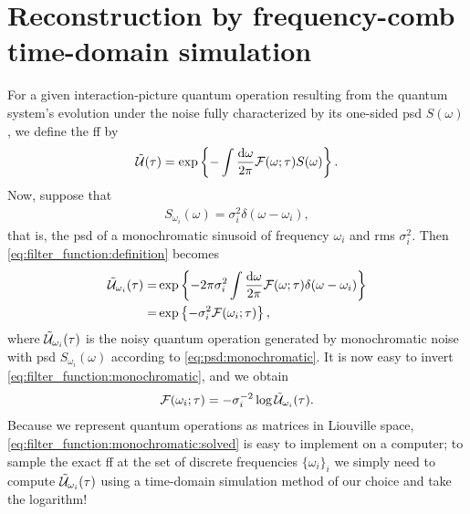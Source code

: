 \chapter{Reconstruction by frequency-comb time-domain simulation}\label{ch:filter_functions:validation}
For a {\color{RWTHmagenta75} given} interaction-picture quantum operation \liouvUe resulting from the quantum system's evolution under the noise fully characterized by its one-sided \gls{psd} $S(\omega)$, we define the \gls{ff} \FF by
\begin{align}
    \label{eq:filter_function:definition}
    \mathcal{\tilde{U}}(\tau) = \exp\left\{-\int\frac{\dd{\omega}}{2\pi}\mathcal{F}(\omega;\tau) S(\omega)\right\}.
\end{align}
Now, suppose that
\begin{align}
    \label{eq:psd:monochromatic}
    S_{\omega_i}(\omega) = \sigma_i^2 \delta(\omega - \omega_i), %
\end{align}
that is, the \gls{psd} of a monochromatic sinusoid of frequency $\omega_i$ and \gls{rms} $\sigma_i^2$.
Then \cref{eq:filter_function:definition} becomes
\begin{equation}
    \label{eq:filter_function:monochromatic}
    \begin{split}
        \mathcal{\tilde{U}}_{\omega_i}(\tau) =& \exp\left\lbrace -2\pi\sigma_i^2\int\frac{\dd{\omega}}{2\pi}\mathcal{F}(\omega;\tau)\delta(\omega - \omega_i)\right\rbrace \\
                                  =& \exp\left\lbrace -\sigma_i^2\mathcal{F}(\omega_i;\tau)\right\rbrace,
    \end{split}
\end{equation}
where $\mathcal{\tilde{U}}_{\omega_i}(\tau)$ is the noisy quantum operation generated by monochromatic noise with \gls{psd} $S_{\omega_i}(\omega)$ according to \cref{eq:psd:monochromatic}.
It is now easy to invert \cref{eq:filter_function:monochromatic}, and we obtain
\begin{align}
    \label{eq:filter_function:monochromatic:solved}
    \mathcal{F}(\omega_i; \tau) = -\sigma_i^{-2}\log\mathcal{\tilde{U}}_{\omega_i}(\tau).
\end{align}
Because we represent quantum operations as matrices in Liouville space, \cref{eq:filter_function:monochromatic:solved} is easy to implement on a computer; to sample the exact \gls{ff} at the set of discrete frequencies $\lbrace\omega_i\rbrace_i$ we simply need to compute $\mathcal{\tilde{U}}_{\omega_i}(\tau)$  using a time-domain simulation method of our choice and take the logarithm!

